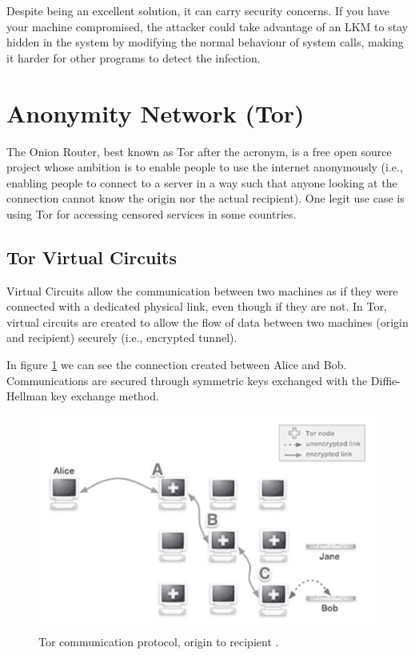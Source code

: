 \documentclass[11pt, a4paper,twoside]{tesi_upf}
\begin{document}
Despite being an excellent solution, it can carry security concerns. If you have your machine compromised, the attacker could take advantage of an LKM to stay hidden in the system by modifying the normal behaviour of system calls, making it harder for other programs to detect the infection.

\section{Anonymity Network (Tor)}
\label{tor-section}

The Onion Router, best known as Tor after the acronym, is a free open source project whose ambition is to enable people to use the internet anonymously (i.e., enabling people to connect to a server in a way such that anyone looking at the connection cannot know the origin nor the actual recipient). One legit use case is using Tor for accessing censored services in some countries.

\subsection{Tor Virtual Circuits}

Virtual Circuits allow the communication between two machines as if they were connected with a dedicated physical link, even though if they are not. In Tor, virtual circuits are created to allow the flow of data between two machines (origin and recipient) securely (i.e., encrypted tunnel).

In figure \ref{fig:virtual_circuit} we can see the connection created between Alice and Bob. Communications are secured through symmetric keys exchanged with the Diffie-Hellman key exchange method.

\begin{figure}
    \centering
    \includegraphics[scale=0.5]{images/virtual_circuit.png}
    \caption{Tor communication protocol, origin to recipient
    \cite{botnet-over-tor}.}
    \label{fig:virtual_circuit}
\end{figure}
\end{document}
